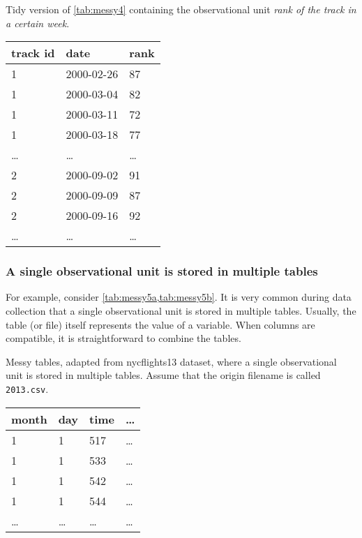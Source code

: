 \begin{tablebox}[label=tab:tidy4b]{Tidy version of \cref{tab:messy4} containing the observational unit \emph{rank of the track in a certain week}.}
  \centering
  \begin{tabular}{lll}
    \toprule
    \textbf{track id} & \textbf{date} & \textbf{rank} \\
    \midrule
    1 & 2000-02-26 & 87 \\
    1 & 2000-03-04 & 82 \\
    1 & 2000-03-11 & 72 \\
    1 & 2000-03-18 & 77 \\
    \dots & \dots & \dots \\
    2 & 2000-09-02 & 91 \\
    2 & 2000-09-09 & 87 \\
    2 & 2000-09-16 & 92 \\
    \dots & \dots & \dots \\
    \bottomrule
  \end{tabular}
\end{tablebox}

\subsubsection{A single observational unit is stored in multiple tables}  For example, consider
\cref{tab:messy5a,tab:messy5b}.  It is very common during data
collection that a single observational unit is stored in multiple tables.  Usually, the
table (or file) itself represents the value of a variable.  When columns are compatible,
it is straightforward to combine the tables.

\begin{tablebox}[label=tab:messy5a]{Messy tables, adapted from nycflights13 dataset, where
  a single observational unit is stored in multiple tables.  Assume that the origin
  filename is called \texttt{2013.csv}.}
  \centering
  \begin{tabular}{llll}
    \toprule
    \textbf{month} & \textbf{day} & \textbf{time} & \textbf{\dots} \\
    \midrule
    1 & 1 & 517 & \dots \\
    1 & 1 & 533 & \dots \\
    1 & 1 & 542 & \dots \\
    1 & 1 & 544 & \dots \\
    \dots & \dots & \dots & \dots \\
    \bottomrule
  \end{tabular}
\end{tablebox}

